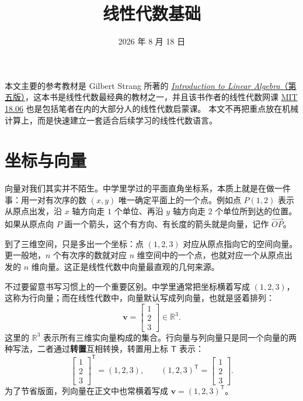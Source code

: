 \documentclass[UTF8,a4paper,12pt]{ctexart}
\title{线性代数基础}
\author{}
\date{2026 年 8 月 18 日}
\numberwithin{equation}{section}
\newcommand{\R}{\mathbb{R}}
\newcommand{\trans}{^{\mathsf T}}
\begin{document}
	
	\maketitle
	\vspace{-2em}
	
	本文主要的参考教材是 Gilbert Strang 所著的
	\href{https://math.mit.edu/~gs/linearalgebra/ila5/indexila5.html}{\textit{Introduction to Linear Algebra}（第五版）}，这本书是线性代数最经典的教材之一，并且该书作者的线性代数网课 \href{https://www.youtube.com/watch?v=Cx5Z-OslNWE&list=PLUl4u3cNGP63oMNUHXqIUcrkS2PivhN3k}{MIT 18.06} 也是包括笔者在内的大部分人的线性代数启蒙课。
	本文不再把重点放在机械计算上，而是快速建立一套适合后续学习的线性代数语言。
	
	\section{坐标与向量}
	
	向量对我们其实并不陌生。中学里学过的平面直角坐标系，本质上就是在做一件事：用一对有次序的数 $(x,y)$ 唯一确定平面上的一个点。例如点 $P(1,2)$ 表示从原点出发，沿 $x$ 轴方向走 $1$ 个单位、再沿 $y$ 轴方向走 $2$ 个单位所到达的位置。如果从原点向 $P$ 画一个箭头，这个有方向、有长度的箭头就是向量，记作 $\overrightarrow{OP}$。
	
	到了三维空间，只是多出一个坐标：点 $(1,2,3)$ 对应从原点指向它的空间向量。更一般地，$n$ 个有次序的数就对应 $n$ 维空间中的一个点，也就对应一个从原点出发的 $n$ 维向量。这正是线性代数中向量最直观的几何来源。
	
	不过要留意书写习惯上的一个重要区别。中学里通常把坐标横着写成 $(1,2,3)$，这称为行向量；而在线性代数中，向量默认写成列向量，也就是竖着排列：
	\begin{equation}\label{eq:1.1}
	\bm{v}=
	\begin{bmatrix}
		1\\
		2\\
		3
	\end{bmatrix}
	\in \R^3.
	\end{equation}
	这里的 $\R^3$ 表示所有三维实向量构成的集合。行向量与列向量只是同一个向量的两种写法，二者通过\textbf{转置}互相转换，转置用上标 $\mathsf T$ 表示：
	\begin{equation}\label{eq:1.2}
	\begin{bmatrix}
		1\\
		2\\
		3
	\end{bmatrix}\trans
	=(1,2,3),
	\qquad
	(1,2,3)\trans=
	\begin{bmatrix}
		1\\
		2\\
		3
	\end{bmatrix}.
	\end{equation}
	为了节省版面，列向量在正文中也常横着写成 $\bm{v}=(1,2,3)\trans$。
	
\end{document}
